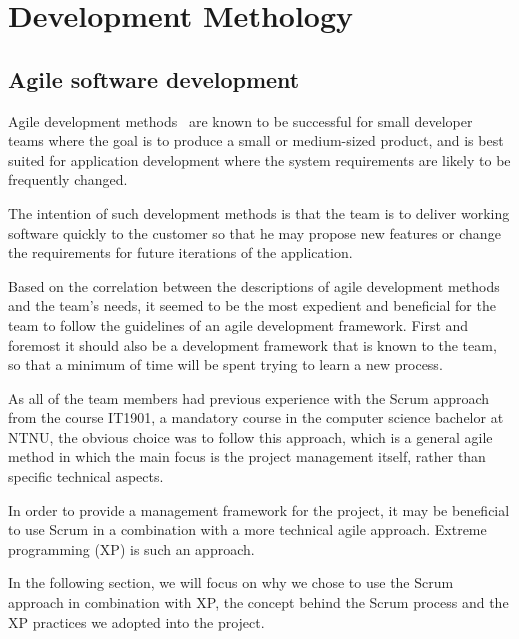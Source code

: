 \section{Development Methology}

\subsection{Agile software development}

Agile development methods~\cite{scrum} are known to be successful for small developer teams where the goal is to produce a small or medium-sized product, and is best suited for application development where the system requirements are likely to be frequently changed.

The intention of such development methods is that the team is to deliver working software quickly to the customer so that he may propose new features or change the requirements for future iterations of the application.

Based on the correlation between the descriptions of agile development methods and the team's needs, it seemed to be the most expedient and beneficial for the team to follow the guidelines of an agile development framework. First and foremost it should also be a development framework that is known to the team, so that a minimum of time will be spent trying to learn a new process.

As all of the team members had previous experience with the Scrum approach from the course IT1901, a mandatory course in the computer science bachelor at NTNU, the obvious choice was to follow this approach, which is a general agile method in which the main focus is the project management itself, rather than specific technical aspects.

In order to provide a management framework for the project, it may be beneficial to use Scrum in a combination with a more technical agile approach. Extreme programming (XP) is such an approach.

In the following section, we will focus on why we chose to use the Scrum approach in combination with XP, the concept behind the Scrum process and the XP practices we adopted into the project. 